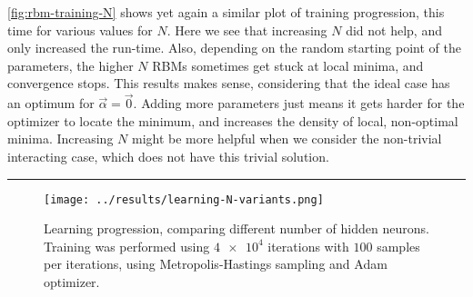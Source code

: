 \documentclass[a4paper, 11pt]{article}
\begin{document}
\begin{multicols}{2}

    \autoref{fig:rbm-training-N} shows yet again a similar plot of training
    progression, this time for various values for $N$. Here we see that
    increasing $N$ did not help, and only increased the run-time. Also,
    depending on the random starting point of the parameters, the higher $N$
    RBMs sometimes get stuck at local minima, and convergence stops. This
    results makes sense, considering that the ideal case has an optimum for
    $\vec \alpha=\vec 0$. Adding more parameters just means it gets harder for
    the optimizer to locate the minimum, and increases the density of local,
    non-optimal minima. Increasing $N$ might be more helpful when we
    consider the non-trivial interacting case, which does not have this trivial
    solution.


\end{multicols}
\hrule
\begin{figure}[ht]
    \centering
    \texttt{[image: ../results/learning-N-variants.png]}
    \caption{Learning progression, comparing different number of hidden neurons.
    Training was performed using $\num{4e4}$ iterations with $100$
    samples per iterations, using Metropolis-Hastings sampling and Adam
    optimizer.}
    \label{fig:rbm-training-N}
\end{figure}
\end{document}
